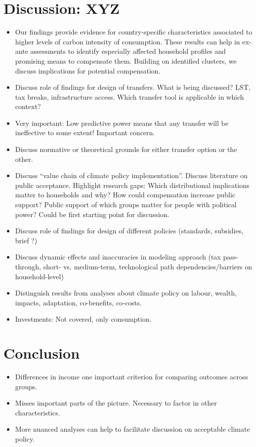 \documentclass[12pt, a4paper]{article}
\begin{document}
\section{Discussion: XYZ} \label{sec:discussion}

\begin{itemize}
\item Our findings provide evidence for country-specific characteristics associated to higher levels of carbon intensity of consumption. These results can help in ex-ante assessments to identify especially affected household profiles and promising means to compensate them. Building on identified clusters, we discuss implications for potential compensation.
  \item Discuss role of findings for design of transfers. What is being discussed? LST, tax breaks, infrastructure access. Which transfer tool is applicable in which context?
  \item Very important: Low predictive power means that any transfer will be ineffective to some extent! Important concern.
  \item Discuss normative or theoretical grounds for either transfer option or the other.
\item Discuss ``value chain of climate policy implementation''. Discuss literature on public acceptance. Highlight research gaps: Which distributional implications matter to households and why? How could compensation increase public support? Public support of which groups matter for people with political power? Could be first starting point for discussion.
 \item Discuss role of findings for design of different policies (standards, subsidies, brief ?)
 \item Discuss dynamic effects and inaccuracies in modeling approach (tax pass-through, short- vs. medium-term, technological path dependencies/barriers on household-level)
 \item Distinguish results from analyses about climate policy on labour, wealth, impacts, adaptation, co-benefits, co-costs.
 \item Investments: Not covered, only consumption.
\end{itemize}

\section{Conclusion} \label{sec:conclusion}

\begin{itemize}
 \item Differences in income one important criterion for comparing outcomes across groups.
 \item Misses important parts of the picture. Necessary to factor in other characteristics.
 \item More nuanced analyses can help to facilitate discussion on acceptable climate policy.
\end{itemize}
\end{document}
